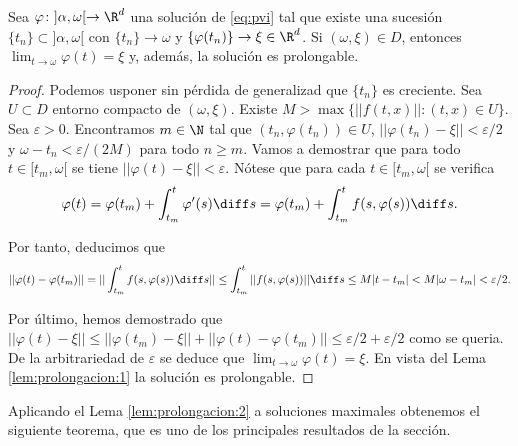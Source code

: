\documentclass{article}
\begin{document}
\begin{lemma}\label{lem:prolongacion:2}
  Sea $\varphi \colon ]\alpha, \omega[ \to \R^d$ una solución de \eqref{eq:pvi} tal que existe una
  sucesión $\{t_n\} \subset ]\alpha, \omega[$ con $\{t_n\} \to \omega$ y
  $\{\varphi(t_n)\} \to \xi \in \R^d$. Si $(\omega, \xi) \in D$, entonces
  $\lim_{t \to \omega} \varphi(t) = \xi$ y, además, la solución es prolongable.
\end{lemma}
\begin{proof}
  Podemos usponer sin pérdida de generalizad que $\{t_n\}$ es creciente. Sea $U \subset D$ entorno
  compacto de $(\omega, \xi)$. Existe $M > \max \{||f(t,x)||: (t,x) \in U\}$. Sea $\varepsilon >
  0$. Encontramos $m \in \N$ tal que $(t_n,\varphi(t_n)) \in U$,
  $||\varphi(t_n) - \xi|| < \varepsilon /2$ y $\omega -t_n < \varepsilon / (2M)$ para todo
  $n \ge m$.  Vamos a demostrar que para todo $t \in [t_m, \omega[$ se tiene
  $||\varphi(t) - \xi|| < \varepsilon$.  Nótese que para cada $t \in [t_m, \omega[$ se verifica
  \[\varphi(t) = \varphi(t_m) + \int_{t_m}^{t} \varphi'(s) \diff s = \varphi(t_m) +
    \int_{t_m}^{t} f(s,\varphi(s)) \diff s.\]

  Por tanto, deducimos que
  \[ ||\varphi(t)-\varphi(t_m)|| = ||\int_{t_m}^{t} f(s,\varphi(s)) \diff s|| \le \int_{t_m}^{t}
    ||f(s,\varphi(s))|| \diff s \le M |t-t_m| < M |\omega-t_m| < \varepsilon/2.\]
  
  Por último, hemos demostrado que
  $||\varphi(t) - \xi|| \le ||\varphi(t_m) - \xi|| + ||\varphi(t)-\varphi(t_m)|| \le \varepsilon / 2
  + \varepsilon/2$ como se queria. De la arbitrariedad de $\varepsilon$ se deduce que
  $\lim_{t \to \omega} \varphi(t) = \xi$. En vista del Lema \ref{lem:prolongacion:1} la solución es
  prolongable.
\end{proof}

Aplicando el Lema \ref{lem:prolongacion:2} a soluciones maximales obtenemos el siguiente teorema,
que es uno de los principales resultados de la sección.
\end{document}
